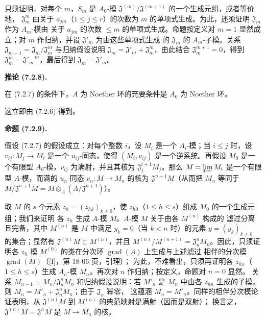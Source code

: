 \documentclass[UTF8,fontset=none,11pt,oneside,openany]{ctexbook}
\newenvironment{proposition}[1][]{%
  \par\medskip\noindent\textbf{命题 (#1).}\ %
}{\par}
\newenvironment{corollary}[1][]{%
  \par\medskip\noindent\textbf{推论 (#1).}\ %
}{\par}
\newcommand{\oldpage}[2][]{%
  \hypertarget{ega-source-page-#1-#2}{}%
  \marginnote{\scriptsize\textbf{#1}~|~#2}\ignorespaces}
\let\EGAOriginalLabel\label
\renewcommand{\label}[1]{\phantomsection\EGAOriginalLabel{#1}}
\begin{document}
\oldpage[0\textsubscript{I}]{65}

只须证明，对每个 $m$，$\overline S_m$ 是 $A_0$-模
$\mathfrak J^{(m)}/\mathfrak J^{(m+1)}$ 的一个生成元组，或者等价地，
$\mathfrak J_m^m$ 由关于 $a_{jm}$（$1\leq j\leq r$）的次数为 $m$
的单项式生成。为此，还须证明 $\mathfrak J_m$ 作为 $A_m$-模由
关于 $a_{jm}$ 的次数 $\leq m$ 的单项式生成。命题按定义对 $m=1$
显然成立；对 $m$ 作归纳，并设 $\mathfrak J'_m$ 为由这些单项式生成
的 $\mathfrak J_m$ 的 $A_m$-子模。关系
$\mathfrak J_{m-1}=\mathfrak J_m/\mathfrak J_m^m$ 与归纳假设说明
$\mathfrak J_m=\mathfrak J'_m+\mathfrak J_m^m$，由此结合
$\mathfrak J_m^{m+1}=0$，得到
$\mathfrak J_m^m={\mathfrak J'_m}^{\,m}$，最后得到
$\mathfrak J_m=\mathfrak J'_m$。

\begin{corollary}[7.2.8]
\label{0.7.2.8-fr}
在 (7.2.7) 的条件下，$A$ 为 Noether 环的充要条件是 $A_0$ 为
Noether 环。
\end{corollary}

这立即由 (7.2.6) 得到。

\begin{proposition}[7.2.9]
\label{0.7.2.9-fr}
假设 (7.2.7) 的假设成立：对每个整数 $i$，设 $M_i$ 是一个
$A_i$-模；当 $i\leq j$ 时，设
$v_{ij}:M_j\to M_i$ 是一个 $u_{ij}$-同态，使得 $(M_i,v_{ij})$
是一个逆系统。再假设 $M_0$ 是一个有限型 $A_0$-模，$v_{ij}$
为满射，并且其核为 $\mathfrak J_j^{i+1}M_j$。那么
$M=\varprojlim M_i$ 是一个有限型 $A$-模，而满的 $u_n$-同态
$v_n:M\to M_n$ 的核为 $\mathfrak J^{n+1}M$（从而把 $M_n$ 等同于
$M/\mathfrak J^{n+1}M=M\otimes_A(A/\mathfrak J^{n+1})$）。
\end{proposition}

取 $M$ 的 $s$ 个元素 $z_h=(z_{hk})_{k\geq0}$，使
$z_{h0}$（$1\leq h\leq s$）组成 $M_0$ 的一个生成元组；我们来证明
各 $z_h$ 生成 $A$-模 $M$。$A$-模 $M$ 关于由各 $M^{(n)}$ 构成的
滤过分离且完备，其中 $M^{(n)}$ 是 $M$ 中满足
$y_k=0$（当 $k<n$ 时）的元素 $y=(y_k)_{k\geq0}$ 的集合；显然有
$\mathfrak J^{(n)}M\subset M^{(n)}$，并且
$M^{(n)}/M^{(n+1)}=\mathfrak J_n^nM_n$。因此，只须证明各 $z_h$
模 $M^{(0)}$ 的类在分次环 $\operatorname{grad}(A)$ 上生成与上述滤过
相伴的分次模 $\operatorname{grad}(M)$（[I]，第 18-06 页，引理）；
为此，不难看出，只须再证明各 $z_{hn}$（$1\leq h\leq s$）生成
$A_n$-模 $M_n$。再次对 $n$ 作归纳；按定义，命题对 $n=0$ 显然。
关系 $M_{n-1}=M_n/\mathfrak J_n^nM_n$ 和归纳假设说明：若 $M'_n$
是 $M_n$ 中由各 $z_{hn}$ 生成的子模，则
$M_n=M'_n+\mathfrak J_n^nM_n$；由于 $\mathfrak J_n$ 幂零，
这蕴涵 $M_n=M'_n$。同样的相伴分次模论证表明，从
$\mathfrak J^{(n)}M$ 到 $M^{(n)}$ 的典范映射是满射（因而是双射）；
换言之，$\mathfrak J^{(n)}M=\mathfrak J^nM$ 是 $M\to M_n$ 的核。
\end{document}
